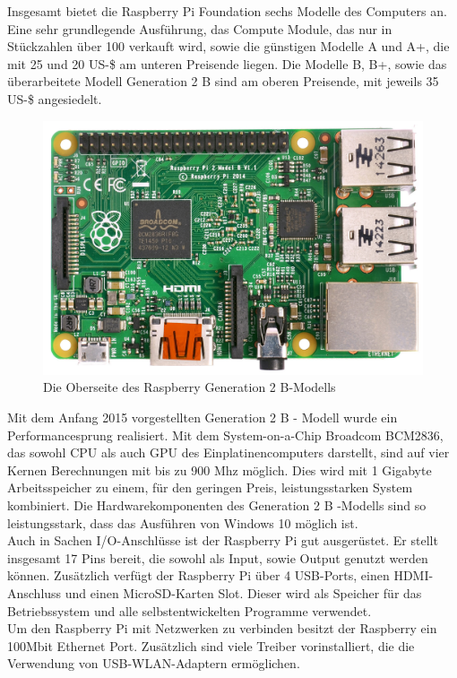 Insgesamt bietet die Raspberry Pi Foundation sechs Modelle des Computers an. Eine sehr grundlegende Ausführung, das Compute Module, das nur in Stückzahlen über 100 verkauft wird, sowie die günstigen Modelle A und A+, die mit 25 und 20 US-\$ am unteren Preisende liegen. Die Modelle B, B+, sowie das überarbeitete Modell Generation 2 B sind am oberen Preisende, mit jeweils 35 US-\$ angesiedelt. \\

\begin{figure}[H] 
	\centering
	\includegraphics[scale=0.5]{Bilder/raspberry2top}
	\caption{Die Oberseite des Raspberry Generation 2 B-Modells\cite{i:raspberry2top}}
	\label{f:raspberry2top}
\end{figure}

Mit dem Anfang 2015 vorgestellten Generation 2 B - Modell wurde ein Performancesprung realisiert. 
Mit dem System-on-a-Chip Broadcom BCM2836, das sowohl CPU als auch GPU des Einplatinencomputers darstellt, sind auf vier Kernen Berechnungen mit bis zu 900 \ac{Mhz} möglich. Dies wird mit 1 Gigabyte Arbeitsspeicher zu einem, für den geringen Preis, leistungsstarken System kombiniert.
Die Hardwarekomponenten des Generation 2 B -Modells sind so leistungsstark, dass das Ausführen von Windows 10 möglich ist.\\

Auch in Sachen I/O-Anschlüsse ist der Raspberry Pi gut ausgerüstet. Er stellt insgesamt 17 Pins bereit, die sowohl als Input, sowie Output genutzt werden können. Zusätzlich verfügt der Raspberry Pi über 4 \ac{USB}-Ports, einen HDMI-Anschluss und einen MicroSD-Karten Slot. Dieser wird als Speicher für das Betriebssystem und alle selbstentwickelten Programme verwendet.\\
Um den Raspberry Pi mit Netzwerken zu verbinden besitzt der Raspberry ein 100Mbit Ethernet Port. Zusätzlich sind viele Treiber vorinstalliert, die die Verwendung von USB-WLAN-Adaptern ermöglichen. 

